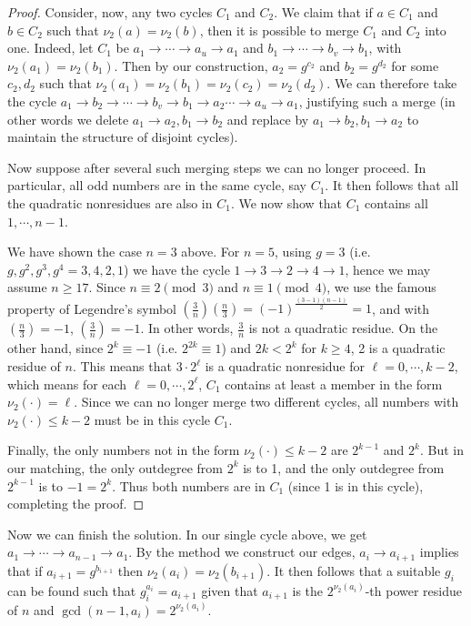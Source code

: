 \documentclass[11pt,a4paper]{article}
\begin{document}
\begin{enumerate}
    \begin{proof}
    	Consider, now, any two cycles $C_1$ and $C_2$. 
    	We claim that if $a\in C_1$ and $b\in C_2$ such that $\nu_2(a)=\nu_2(b)$, 
    	then it is possible to merge $C_1$ and $C_2$ into one. 
    	Indeed, 
    	let $C_1$ be $a_1\to \cdots \to a_u\to a_1$ and $b_1\to\cdots\to b_v\to b_1$, 
    	with $\nu_2(a_1)=\nu_2(b_1)$. 
    	Then by our construction, $a_2=g^{c_2}$ and $b_2=g^{d_2}$ for some $c_2, d_2$ 
    	such that $\nu_2(a_1)=\nu_2(b_1)=\nu_2(c_2)=\nu_2(d_2)$. 
    	We can therefore take the cycle 
    	$a_1\to b_2\to\cdots \to b_v\to b_1\to a_2\cdots \to a_u\to a_1$, 
    	justifying such a merge 
    	(in other words we delete $a_1\to a_2, b_1\to b_2$ and replace by $a_1\to b_2, b_1\to a_2$ to maintain the structure of disjoint cycles). 
    	
    	Now suppose after several such merging steps we can no longer proceed. 
    	In particular, all odd numbers are in the same cycle, say $C_1$. 
    	It then follows that all the quadratic nonresidues are also in $C_1$. 
    	We now show that $C_1$ contains all $1, \cdots, n-1$. 
    	
    	We have shown the case $n=3$ above. 
    	For $n=5$, using $g=3$ (i.e. $g, g^2, g^3, g^4=3,4,2,1$) we have the cycle 
    	$1\to 3\to 2\to 4\to 1$, 
    	hence we may assume $n\ge 17$.
    	Since $n\equiv 2\pmod{3}$ and $n\equiv 1\pmod{4}$, 
    	we use the famous property of Legendre's symbol 
    	$(\frac{3}{n})(\frac{n}{3})=(-1)^{\frac{(3-1)(n-1)}{2}}=1$, 
    	and with $(\frac{n}{3})=-1$, $(\frac{3}{n})=-1$. 
    	In other words, $\frac 3n$ is not a quadratic residue. 
    	On the other hand, 
    	since $2^k\equiv -1$ (i.e. $2^{2k}\equiv 1$) 
    	and $2k < 2^k$ for $k\ge 4$, 
    	2 is a quadratic residue of $n$. 
    	This means that $3\cdot 2^{\ell}$ is a quadratic nonresidue for 
    	$\ell=0, \cdots, k-2$, 
    	which means for each $\ell=0, \cdots, 2^{\ell}$, 
    	$C_1$ contains at least a member in the form $\nu_2(\cdot)=\ell$. 
    	Since we can no longer merge two different cycles, 
    	all numbers with $\nu_2(\cdot)\le k-2$ must be in this cycle $C_1$. 
    	
    	Finally, the only numbers not in the form $\nu_2(\cdot)\le k-2$ are $2^{k-1}$ and $2^k$. 
    	But in our matching, the only outdegree from $2^{k}$ is to 1, 
    	and the only outdegree from $2^{k-1}$ is to $-1=2^k$. 
    	Thus both numbers are in $C_1$ (since 1 is in this cycle), 
    	completing the proof. 
    \end{proof}
    
    Now we can finish the solution. In our single cycle above, we get $a_1\to\cdots \to a_{n-1}\to a_1$. 
    By the method we construct our edges, $a_i\to a_{i+1}$ implies that if $a_{i+1}=g^{b_{i+1}}$ then $\nu_2(a_i)=\nu_2(b_{i+1})$. 
    It then follows that a suitable $g_i$ can be found such that $g_i^{a_i}=a_{i+1}$ given that $a_{i+1}$ is the $2^{\nu_2(a_i)}$-th power residue of $n$ and $\gcd(n-1, a_i)=2^{\nu_2(a_i)}$. 
    
    
    
    
	
\end{enumerate}
\end{document}

